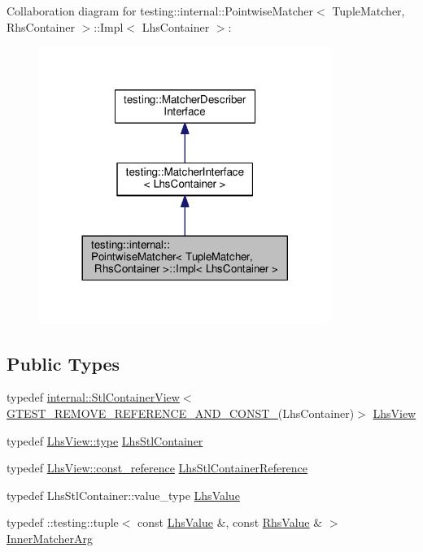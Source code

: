 Collaboration diagram for testing\+:\+:internal\+:\+:Pointwise\+Matcher$<$ Tuple\+Matcher, Rhs\+Container $>$\+:\+:Impl$<$ Lhs\+Container $>$\+:\nopagebreak
\begin{figure}[H]
\begin{center}
\leavevmode
\includegraphics[width=269pt]{classtesting_1_1internal_1_1PointwiseMatcher_1_1Impl__coll__graph}
\end{center}
\end{figure}
\subsection*{Public Types}
\begin{DoxyCompactItemize}
\item 
typedef \hyperlink{classtesting_1_1internal_1_1StlContainerView}{internal\+::\+Stl\+Container\+View}$<$ \hyperlink{gtest-internal_8h_a874567b176266188fabfffb8393267ce}{G\+T\+E\+S\+T\+\_\+\+R\+E\+M\+O\+V\+E\+\_\+\+R\+E\+F\+E\+R\+E\+N\+C\+E\+\_\+\+A\+N\+D\+\_\+\+C\+O\+N\+S\+T\+\_\+}(Lhs\+Container)$>$ \hyperlink{classtesting_1_1internal_1_1PointwiseMatcher_1_1Impl_a5240abc710bb0a5bedfd180bf6701fae}{Lhs\+View}
\item 
typedef \hyperlink{classtesting_1_1internal_1_1StlContainerView_a2b2c63a6dcdbfe63fb0ee121ebf463ba}{Lhs\+View\+::type} \hyperlink{classtesting_1_1internal_1_1PointwiseMatcher_1_1Impl_a23420b57b4cd6d83cec8afda746c27f2}{Lhs\+Stl\+Container}
\item 
typedef \hyperlink{classtesting_1_1internal_1_1StlContainerView_a9cd4f6ed689b3938cdb7b3c4cbf1b36b}{Lhs\+View\+::const\+\_\+reference} \hyperlink{classtesting_1_1internal_1_1PointwiseMatcher_1_1Impl_a9df3eb0866f76d59dbdd35fafeb5590c}{Lhs\+Stl\+Container\+Reference}
\item 
typedef Lhs\+Stl\+Container\+::value\+\_\+type \hyperlink{classtesting_1_1internal_1_1PointwiseMatcher_1_1Impl_a453769e721f4212e399f76c980b4b65c}{Lhs\+Value}
\item 
typedef \+::testing\+::tuple$<$ const \hyperlink{classtesting_1_1internal_1_1PointwiseMatcher_1_1Impl_a453769e721f4212e399f76c980b4b65c}{Lhs\+Value} \&, const \hyperlink{classtesting_1_1internal_1_1PointwiseMatcher_a9f7f1abbfa795033e1e1c1df385b4617}{Rhs\+Value} \& $>$ \hyperlink{classtesting_1_1internal_1_1PointwiseMatcher_1_1Impl_aba9d983881cbfbb37724b8b40e863898}{Inner\+Matcher\+Arg}
\end{DoxyCompactItemize}
